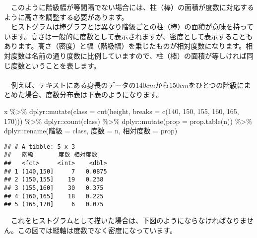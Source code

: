 \documentclass[
  12pt,
]{book}
\newenvironment{Shaded}{\begin{snugshade}}{\end{snugshade}}
\newcommand{\AttributeTok}[1]{\textcolor[rgb]{0.77,0.63,0.00}{#1}}
\newcommand{\DecValTok}[1]{\textcolor[rgb]{0.00,0.00,0.81}{#1}}
\newcommand{\FunctionTok}[1]{\textcolor[rgb]{0.00,0.00,0.00}{#1}}
\newcommand{\NormalTok}[1]{#1}
\newcommand{\OtherTok}[1]{\textcolor[rgb]{0.56,0.35,0.01}{#1}}
\newcommand{\SpecialCharTok}[1]{\textcolor[rgb]{0.00,0.00,0.00}{#1}}
\newcommand{\StringTok}[1]{\textcolor[rgb]{0.31,0.60,0.02}{#1}}
\begin{document}
　このように階級幅が等間隔でない場合には、柱（棒）の面積が度数に対応するように高さを調整する必要があります。\\
　ヒストグラムは棒グラフとは異なり階級ごとの柱（棒）の面積が意味を持っています。高さは一般的に度数として表示されますが、密度として表示することもあります。高さ（密度）と幅（階級幅）を乗じたものが相対度数になります。相対度数は名前の通り度数に比例していますので、柱（棒）の面積が等しければ同じ度数ということを表します。\\
　\\
　例えば、テキストにある身長のデータの\(140cm\)から\(150cm\)をひとつの階級にまとめた場合、度数分布表は下表のようになります。

\begin{Shaded}
\begin{Highlighting}[]
\NormalTok{x }\SpecialCharTok{\%\textgreater{}\%} 
\NormalTok{  dplyr}\SpecialCharTok{::}\FunctionTok{mutate}\NormalTok{(}\AttributeTok{class =} \FunctionTok{cut}\NormalTok{(height,}
                            \AttributeTok{breaks =} \FunctionTok{c}\NormalTok{(}\DecValTok{140}\NormalTok{, }\DecValTok{150}\NormalTok{, }\DecValTok{155}\NormalTok{, }\DecValTok{160}\NormalTok{, }\DecValTok{165}\NormalTok{, }\DecValTok{170}\NormalTok{))) }\SpecialCharTok{\%\textgreater{}\%} 
\NormalTok{  dplyr}\SpecialCharTok{::}\FunctionTok{count}\NormalTok{(class) }\SpecialCharTok{\%\textgreater{}\%} 
\NormalTok{  dplyr}\SpecialCharTok{::}\FunctionTok{mutate}\NormalTok{(}\AttributeTok{prop =} \FunctionTok{prop.table}\NormalTok{(n)) }\SpecialCharTok{\%\textgreater{}\%} 
\NormalTok{  dplyr}\SpecialCharTok{::}\FunctionTok{rename}\NormalTok{(}\StringTok{\textasciigrave{}}\AttributeTok{階級}\StringTok{\textasciigrave{}} \OtherTok{=}\NormalTok{ class, }\StringTok{\textasciigrave{}}\AttributeTok{度数}\StringTok{\textasciigrave{}} \OtherTok{=}\NormalTok{ n, }\StringTok{\textasciigrave{}}\AttributeTok{相対度数}\StringTok{\textasciigrave{}} \OtherTok{=}\NormalTok{ prop)}
\end{Highlighting}
\end{Shaded}

\begin{verbatim}
## # A tibble: 5 x 3
##   階級       度数 相対度数
##   <fct>     <int>    <dbl>
## 1 (140,150]     7   0.0875
## 2 (150,155]    19   0.238 
## 3 (155,160]    30   0.375 
## 4 (160,165]    18   0.225 
## 5 (165,170]     6   0.075
\end{verbatim}

　これをヒストグラムとして描いた場合は、下図のようにならなければなりません。この図では縦軸は度数でなく密度になっています。
\end{document}
